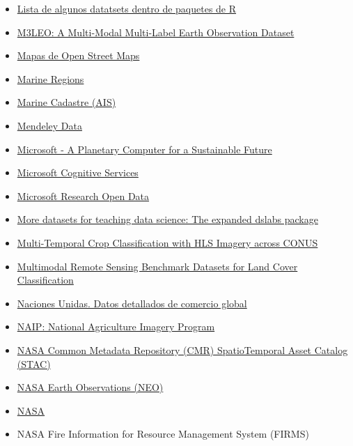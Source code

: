 \documentclass[
  letterpaper,
  DIV=11,
  numbers=noendperiod]{scrartcl}
\begin{document}
\begin{itemize}
  zonas de comercio.
\item
  \href{https://vincentarelbundock.github.io/Rdatasets/datasets.html}{Lista
  de algunos datatsets dentro de paquetes de R}
\item
  \href{https://huggingface.co/M3LEO}{M3LEO: A Multi-Modal Multi-Label
  Earth Observation Dataset}
\item
  \href{http://download.geofabrik.de/}{Mapas de Open Street Maps}
\item
  \href{https://marineregions.org/downloads.php}{Marine Regions}
\item
  \href{https://hub.marinecadastre.gov/}{Marine Cadastre (AIS)}
\item
  \href{https://data.mendeley.com/}{Mendeley Data}
\item
  \href{https://planetarycomputer.microsoft.com/}{Microsoft - A
  Planetary Computer for a Sustainable Future}
\item
  \href{https://www.microsoft.com/cognitive-services/}{Microsoft
  Cognitive Services}
\item
  \href{https://msropendata.com/}{Microsoft Research Open Data}
\item
  \href{https://simplystatistics.org/posts/2019-07-19-more-datasets-for-teaching-data-science-the-expanded-dslabs-package/}{More
  datasets for teaching data science: The expanded dslabs package}
\item
  \href{https://beta.source.coop/repositories/clarkcga/multi-temporal-crop-classification/description/}{Multi-Temporal
  Crop Classification with HLS Imagery across CONUS}
\item
  \href{https://github.com/danfenghong/ISPRS_S2FL}{Multimodal Remote
  Sensing Benchmark Datasets for Land Cover Classification}
\item
  \href{https://comtradeplus.un.org/}{Naciones Unidas. Datos detallados
  de comercio global}
\item
  \href{https://developers.google.com/earth-engine/datasets/catalog/USDA_NAIP_DOQQ}{NAIP:
  National Agriculture Imagery Program}
\item
  \href{https://github.com/opengeos/aws-open-data-stac}{NASA Common
  Metadata Repository (CMR) SpatioTemporal Asset Catalog (STAC)}
\item
  \href{https://neo.gsfc.nasa.gov/}{NASA Earth Observations (NEO)}
\item
  \href{https://nssdc.gsfc.nasa.gov/}{NASA}
\item
  NASA Fire Information for Resource Management System (FIRMS)

\end{itemize}
\end{document}
